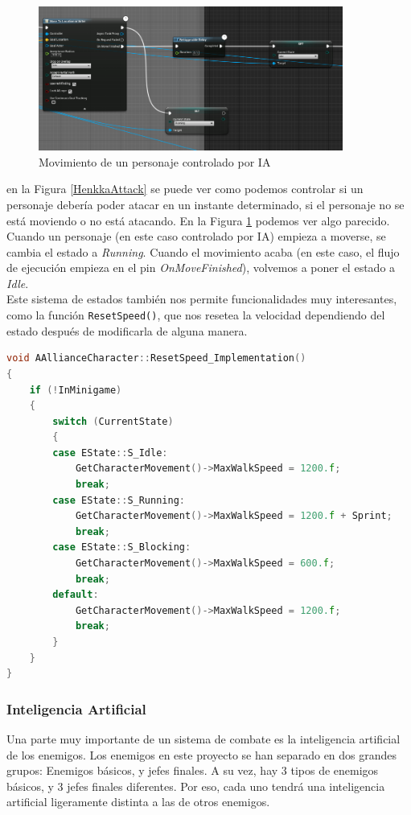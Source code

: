 \begin{figure}[H]
  \centering
  \includegraphics[width=10cm]{./images/Henkka_Move.png}
  \caption{Movimiento de un personaje controlado por IA}
  \label{HenkkaMove}
\end{figure}


en la Figura \ref{HenkkaAttack} se puede ver como podemos controlar si un personaje debería poder atacar en un instante determinado, si el personaje no se está moviendo o no está atacando. En la Figura \ref{HenkkaMove} podemos ver algo parecido. Cuando un personaje (en este caso controlado por \ac{IA}) empieza a moverse, se cambia el estado a \textit{Running}. Cuando el movimiento acaba (en este caso, el flujo de ejecución empieza en el pin \textit{OnMoveFinished}), volvemos a poner el estado a \textit{Idle}.
\\

Este sistema de estados también nos permite funcionalidades muy interesantes, como la función \texttt{ResetSpeed()}, que nos resetea la velocidad dependiendo del estado después de modificarla de alguna manera.

\begin{lstlisting}[language=c++,caption={},captionpos=b,label={ResetSpeed}]
void AAllianceCharacter::ResetSpeed_Implementation()
{
	if (!InMinigame)
	{
		switch (CurrentState)
		{
		case EState::S_Idle:
			GetCharacterMovement()->MaxWalkSpeed = 1200.f;
			break;
		case EState::S_Running:
			GetCharacterMovement()->MaxWalkSpeed = 1200.f + Sprint;
			break;
		case EState::S_Blocking:
			GetCharacterMovement()->MaxWalkSpeed = 600.f;
			break;
		default:
			GetCharacterMovement()->MaxWalkSpeed = 1200.f;
			break;
		}
	}
}
\end{lstlisting}


\subsubsection{Inteligencia Artificial}

Una parte muy importante de un sistema de combate es la inteligencia artificial de los enemigos. Los enemigos en este proyecto se han separado en dos grandes grupos: Enemigos básicos, y jefes finales. A su vez, hay 3 tipos de enemigos básicos, y 3 jefes finales diferentes. Por eso, cada uno tendrá una inteligencia artificial ligeramente distinta a las de otros enemigos.
\\

